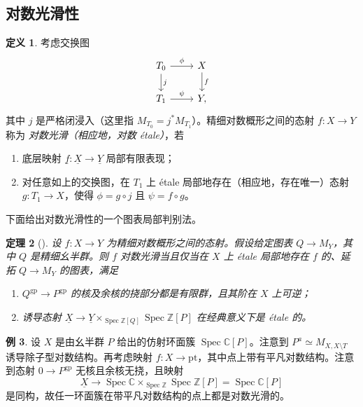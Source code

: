 \documentclass{amsart}
\newtheorem{thm}{定理}[section]
\theoremstyle{definition}
\newtheorem{defn}[thm]{定义}
\newtheorem{exm}[thm]{例}
\theoremstyle{remark}
\theoremstyle{plain}
\theoremstyle{definition}
\theoremstyle{remark}
\newcommand{\C}{\mathbb{C}}
\newcommand{\Z}{\mathbb{Z}}
\newcommand{\mr}[1]{\mathrm{#1}}
\newcommand{\ul}[1]{\underline{#1}}
\newcommand{\1}{\mathbf{1}}
\newcommand{\2}{\mathbf{2}}
\newcommand{\3}{\mathbf{3}}
\DeclareMathOperator{\Spec}{Spec}
\begin{document}
\subsection{对数光滑性}%
\label{sub:Log smoothness}

\begin{defn}
    考虑交换图
    \begin{equation*}
    \begin{tikzcd}
        T_0 \ar{r}{\phi} \ar{d}{j} & X \ar{d}{f} \\
        T_1 \ar{r}{\psi} & Y,
    \end{tikzcd}
    \end{equation*}
    其中 \(j\) 是严格闭浸入（这里指 \(M_{T_0} = j^* M_{T_1}\)）。精细对数概形之间的态射 \(f \colon X \to Y\) 称为 \textit{对数光滑（相应地，对数 \'etale）}，若
    \begin{enumerate}
        \item 底层映射 \(\ul{f} \colon \ul{X} \to \ul{Y}\) 局部有限表现；
        \item 对任意如上的交换图，在 \(T_1\) 上 \'etale 局部地存在（相应地，存在唯一）态射 \(g \colon T_1 \to X\)，使得 \(\phi = g \circ j\) 且 \(\psi = f \circ g\)。
    \end{enumerate}
\end{defn}

下面给出对数光滑性的一个图表局部判别法。

\begin{thm}[{\cite[Theorem~3.5]{Kato1989}}]
    设 \(f \colon X \to Y\) 为精细对数概形之间的态射。假设给定图表 \(Q \to M_Y\)，其中 \(Q\) 是精细幺半群。则 \(f\) 对数光滑当且仅当在 \(X\) 上 \'etale 局部地存在 \(f\) 的、延拓 \(Q \to M_Y\) 的图表，满足
    \begin{enumerate}
        \item \(Q^{\mr{gp}} \to P^{\mr{gp}}\) 的核及余核的挠部分都是有限群，且其阶在 \(X\) 上可逆；
        \item 诱导态射 \(\ul{X} \to \ul{Y} \times_{\Spec \Z[Q]} \Spec \Z[P]\) 在经典意义下是 \'etale 的。
    \end{enumerate}
\end{thm}

\begin{exm}
    设 \(X\) 是由幺半群 \(P\) 给出的仿射环面簇 \(\Spec \C[P]\)。注意到 \(P^a \simeq M_{X, X \setminus T}\) 诱导除子型对数结构。再考虑映射 \(f \colon X \to \mr{pt}\)，其中点上带有平凡对数结构。注意到态射 \(0 \to P^{\mr{gp}}\) 无核且余核无挠，且映射
    \[ \ul{X} \to \Spec \C \times_{\Spec \Z} \Spec \Z[P] = \Spec \C[P] \]
    是同构，故任一环面簇在带平凡对数结构的点上都是对数光滑的。
\end{exm}
\end{document}
